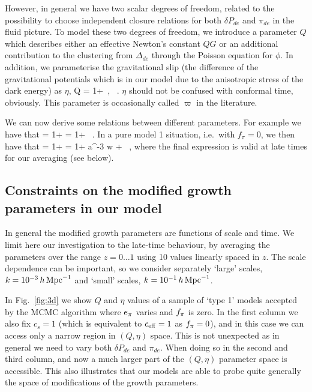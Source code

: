 However, in general we have two scalar degrees of freedom, related to the possibility to choose independent closure relations for
both $\delta P_{de}$ and $\pi_{de}$ in the fluid picture. To model these two degrees of freedom, 
we introduce a parameter $Q$ which describes either an effective Newton's constant $Q G$ or an additional contribution
to the clustering from $\Delta_{de}$ through the Poisson equation for $\phi$.
In addition, we parameterise the gravitational slip (the difference of the gravitational potentials which is in our model due to the
anisotropic stress of the dark energy) as $\eta$,
\be
Q \equiv {}
= 1+ 
\,, \qquad
\eta \equiv \frac{\phi}{\psi} \, .
\ee
$\eta$ should not be confused with conformal time, obviously. This parameter is occasionally called $\varpi$ in the literature.

We can now derive some relations between different parameters. For example we have that
\be
{} = 1+   = 1+  \, .
\ee
In a pure model 1 situation, i.e.\ with $f_\pi=0$, we then have that
\be
{} = 1+   = 1+   a^{-3 w} +  \, ,
\label{eq:q_eta}
\ee
where the final expression is valid at late times for our averaging (see below). 

\subsection{Constraints on the modified growth parameters in our model}

In general the modified growth parameters are functions of scale and time. We limit here our investigation to the late-time behaviour,
by averaging the parameters over the range $z=0\ldots 1$ using 10 values linearly spaced in $z$. The scale dependence can be
important, so we consider separately `large' scales, $k = 10^{-3} \,h\, \Mpc^{-1}$ and `small' scales, $k = 10^{-1} \,h\, \Mpc^{-1}$. 

In Fig.\ \ref{fig:3d} we show $Q$ and $\eta$ values of a sample of `type 1' models accepted by the MCMC algorithm where $\aa$ varies and $\ff$ is zero. In the first column
we also fix $c_s=1$ (which is equivalent to $\ceff=1$ as $\ff=0$), and in this case we can access only a narrow region in $(Q,\eta)$
space. This is not unexpected as in general we need to vary both $\delta P_{de}$ and $\pi_{de}$. When doing so in the second and third column,
and now a much larger part of the $(Q,\eta)$ parameter space is accessible.  This also illustrates that our models are able to probe
quite generally the space of modifications of the growth parameters.

